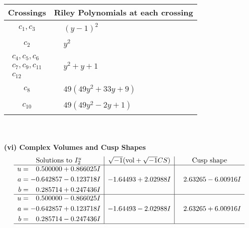 \documentclass[1p]{elsarticle_modified}
\theoremstyle{definition}
\newcommand{\I}{\sqrt{-1}}
\begin{document}
\begin{tabular}{m{50pt}|m{274pt}}
Crossings & \hspace{64pt}Riley Polynomials at each crossing \\
\hline $$\begin{aligned}c_{1},c_{3}\end{aligned}$$&$\begin{aligned}
&(y-1)^2
\end{aligned}$\\
\hline $$\begin{aligned}c_{2}\end{aligned}$$&$\begin{aligned}
&y^2
\end{aligned}$\\
\hline $$\begin{aligned}c_{4},c_{5},c_{6}\\c_{7},c_{9},c_{11}\\c_{12}\end{aligned}$$&$\begin{aligned}
&y^2+y+1
\end{aligned}$\\
\hline $$\begin{aligned}c_{8}\end{aligned}$$&$\begin{aligned}
&49(49 y^2+33 y+9)
\end{aligned}$\\
\hline $$\begin{aligned}c_{10}\end{aligned}$$&$\begin{aligned}
&49(49 y^2-2 y+1)
\end{aligned}$\\
\hline
\end{tabular}\\~\\
\newpage\flushleft \textbf{(vi) Complex Volumes and Cusp Shapes}
$$\begin{array}{c|c|c}  
\text{Solutions to }I^u_{2}& \I (\text{vol} + \sqrt{-1}CS) & \text{Cusp shape}\\
 \hline 
\begin{aligned}
u &= \phantom{-}0.500000 + 0.866025 I \\
a &= -0.642857 - 0.123718 I \\
b &= \phantom{-}0.285714 + 0.247436 I\end{aligned}
 & -1.64493 + 2.02988 I & \phantom{-}2.63265 - 6.00916 I \\ \hline\begin{aligned}
u &= \phantom{-}0.500000 - 0.866025 I \\
a &= -0.642857 + 0.123718 I \\
b &= \phantom{-}0.285714 - 0.247436 I\end{aligned}
 & -1.64493 - 2.02988 I & \phantom{-}2.63265 + 6.00916 I\\
 \hline 
 \end{array}$$\newpage
\end{document}
